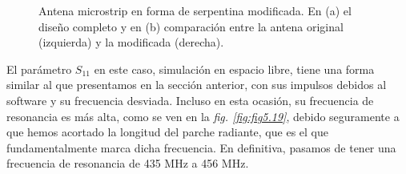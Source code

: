 \begin{figure}[!htb]
    \centering
    \caption{Antena microstrip en forma de serpentina modificada. En (a) el diseño completo y en (b) comparación entre la antena original (izquierda) y la modificada (derecha).}
    \label{fig:fig5.17}
\end{figure}

El parámetro $S_{11}$ en este caso, simulación en espacio libre, tiene una forma similar al que presentamos en la sección anterior, con sus impulsos debidos al software y su frecuencia desviada. Incluso en esta ocasión, su frecuencia de resonancia es más alta, como se ven en la \textit{fig. \ref{fig:fig5.19}}, debido seguramente a que hemos acortado la longitud del parche radiante, que es el que fundamentalmente marca dicha frecuencia. En definitiva, pasamos de tener una frecuencia de resonancia de 435 MHz a 456 MHz.

